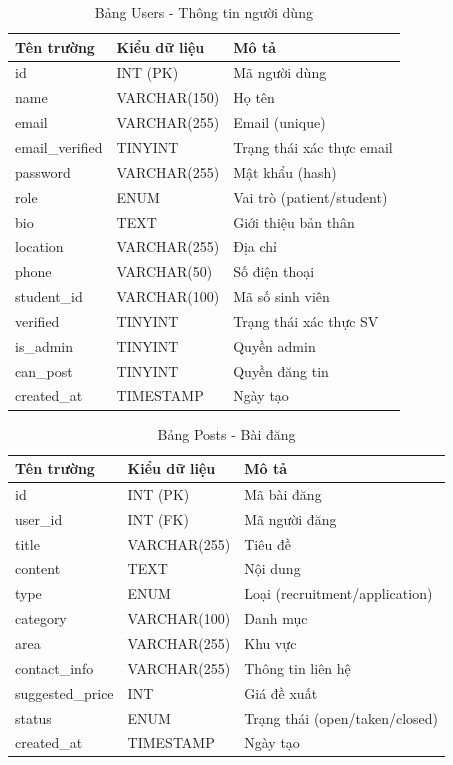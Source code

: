 \documentclass[a4paper,13pt]{extreport}
\begin{document}
\begin{table}[H]
\centering
\caption{Bảng Users - Thông tin người dùng}
\begin{tabular}{|l|l|l|}
\hline
\textbf{Tên trường} & \textbf{Kiểu dữ liệu} & \textbf{Mô tả} \\
\hline
id & INT (PK) & Mã người dùng \\
name & VARCHAR(150) & Họ tên \\
email & VARCHAR(255) & Email (unique) \\
email\_verified & TINYINT & Trạng thái xác thực email \\
password & VARCHAR(255) & Mật khẩu (hash) \\
role & ENUM & Vai trò (patient/student) \\
bio & TEXT & Giới thiệu bản thân \\
location & VARCHAR(255) & Địa chỉ \\
phone & VARCHAR(50) & Số điện thoại \\
student\_id & VARCHAR(100) & Mã số sinh viên \\
verified & TINYINT & Trạng thái xác thực SV \\
is\_admin & TINYINT & Quyền admin \\
can\_post & TINYINT & Quyền đăng tin \\
created\_at & TIMESTAMP & Ngày tạo \\
\hline
\end{tabular}
\end{table}

\begin{table}[H]
\centering
\caption{Bảng Posts - Bài đăng}
\begin{tabular}{|l|l|l|}
\hline
\textbf{Tên trường} & \textbf{Kiểu dữ liệu} & \textbf{Mô tả} \\
\hline
id & INT (PK) & Mã bài đăng \\
user\_id & INT (FK) & Mã người đăng \\
title & VARCHAR(255) & Tiêu đề \\
content & TEXT & Nội dung \\
type & ENUM & Loại (recruitment/application) \\
category & VARCHAR(100) & Danh mục \\
area & VARCHAR(255) & Khu vực \\
contact\_info & VARCHAR(255) & Thông tin liên hệ \\
suggested\_price & INT & Giá đề xuất \\
status & ENUM & Trạng thái (open/taken/closed) \\
created\_at & TIMESTAMP & Ngày tạo \\
\hline
\end{tabular}
\end{table}
\end{document}
